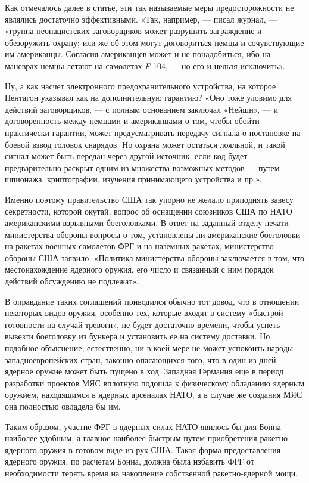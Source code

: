 \documentclass[12pt, a4paper, openany]{book}
\begin{document}
	Как отмечалось далее в статье, эти так называемые меры предосторожности не являлись достаточно эффективными. «Так, например, — писал журнал, — «группа неонацистских заговорщиков может разрушить заграждение и обезоружить охрану; или же об этом могут договориться немцы и сочувствующие им американцы. Согласия американцев может и не понадобиться, ибо на маневрах немцы летают на самолетах \textit{F}-104, — но его и нельзя исключить».
	
	Ну, а как насчет электронного предохранительного устройства, на которое Пентагон указывал как на дополнительную гарантию? «Оно тоже уловимо для действий заговорщиков, — с полным основанием заключал «Нейшн», — и договоренность между немцами и американцами о том, чтобы обойти практически гарантии, может предусматривать передачу сигнала о постановке на боевой взвод головок снарядов. Но охрана может остаться лояльной, и такой сигнал может быть передан через другой источник, если код будет предварительно раскрыт одним из множества возможных методов — путем шпионажа, криптографии, изучения принимающего устройства и пр.».
	
	Именно поэтому правительство США так упорно не желало приподнять завесу секретности, которой окутай, вопрос об оснащении союзников США по НАТО американскими взрывными боеголовками. В ответ на заданный отделу печати министерства обороны вопросы о том, установлены ли американские боеголовки на ракетах военных самолетов ФРГ и на наземных ракетах, министерство обороны США заявило: «Политика министерства обороны заключается в том, что местонахождение ядерного оружия, его число и связанный с ним порядок действий обсуждению не подлежат».
	
	В оправдание таких соглашений приводился обычно тот довод, что в отношении некоторых видов оружия, особенно тех, которые входят в систему «быстрой готовности на случай тревоги», не будет достаточно времени, чтобы успеть вывезти боеголовку из бункера и установить ее на систему доставки. Но подобное объяснение, естественно, ни в коей мере не может успокоить народы западноевропейских стран, законно опасающихся того, что в один из дней ядерное оружие может быть пущено в ход. Западная Германия еще в период разработки проектов МЯС вплотную подошла к физическому обладанию ядерным оружием, находящимся в ядерных арсеналах НАТО, а в случае же создания МЯС она полностью овладела бы им.
	
	Таким образом, участие ФРГ в ядерных силах НАТО явилось бы для Бонна наиболее удобным, а главное наиболее быстрым путем приобретения ракетно-ядерного оружия в готовом виде из рук США. Такая форма предоставления ядерного оружия, по расчетам Бонна, должна была избавить ФРГ от необходимости терять время на накопление собственной ракетно-ядерной мощи.
	
\end{document}
